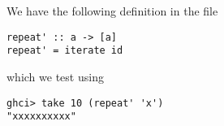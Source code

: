 
We have the following definition in the file 
\scriptsize\begin{verbatim}
repeat' :: a -> [a]
repeat' = iterate id
\end{verbatim}\normalsize
which we test using
\scriptsize\begin{verbatim}
ghci> take 10 (repeat' 'x')
"xxxxxxxxxx"
\end{verbatim}\normalsize
